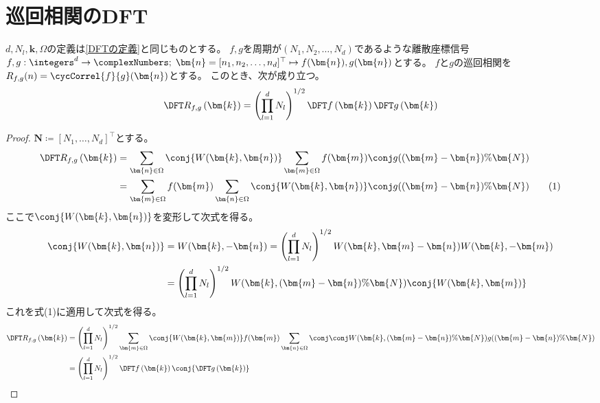    \section{巡回相関のDFT}
        \begin{shadebox}
            $d,N_l,\bm{k},\Omega$の定義は\ref{DFTの定義}と同じものとする。
            $f,g$を周期が$(N_1,N_2,\dots,N_d)$であるような離散座標信号$f,g: \integers^d\to\complexNumbers;\;\bm{n} = [n_1,n_2,\dots,n_d]^\top \mapsto f(\bm{n}),g(\bm{n})$とする。
            $f$と$g$の巡回相関を$R_{f,g}(n) = \cycCorrel{f}{g}(\bm{n})$とする。
            このとき、次が成り立つ。
            \[ \DFTwithArg{R_{f,g}}{\bm{k}} = \left(\prod_{l=1}^d N_l\right)^{1/2}\DFTwithArg{f}{\bm{k}}\DFTwithArg{g}{\bm{k}} \]
        \end{shadebox}
        \begin{proof}
            \quad\par
            $\bm{N} \coloneqq [N_1,\dots,N_d]^\top$とする。
            \begin{align*}
                \DFTwithArg{R_{f,g}}{\bm{k}} &= \sum_{\bm{n}\in\Omega} \conj{W(\bm{k},\bm{n})} \sum_{\bm{m}\in\Omega} f(\bm{m})\conj{g((\bm{m}-\bm{n})\%\bm{N})} \\
                &= \sum_{\bm{m}\in\Omega} f(\bm{m}) \sum_{\bm{n}\in\Omega} \conj{W(\bm{k},\bm{n})}\conj{g((\bm{m}-\bm{n})\%\bm{N})} \tag{1}
            \end{align*}
            ここで$\conj{W(\bm{k},\bm{n})}$を変形して次式を得る。
            \begin{align*}
                \conj{W(\bm{k},\bm{n})} &= W(\bm{k},-\bm{n}) = \left(\prod_{l=1}^d N_l\right)^{1/2}W(\bm{k},\bm{m}-\bm{n})W(\bm{k},-\bm{m}) \\
                &= \left(\prod_{l=1}^d N_l\right)^{1/2}W(\bm{k},(\bm{m}-\bm{n})\%\bm{N})\conj{W(\bm{k},\bm{m})}
            \end{align*}
            これを式(1)に適用して次式を得る。
            \begin{align*}
                \DFTwithArg{R_{f,g}}{\bm{k}} &= \left(\prod_{l=1}^d N_l\right)^{1/2} \sum_{\bm{m}\in\Omega} \conj{W(\bm{k},\bm{m})}f(\bm{m}) \sum_{\bm{n}\in\Omega}\conj{\conj{W(\bm{k},(\bm{m}-\bm{n})\%\bm{N})}g((\bm{m}-\bm{n})\%\bm{N})} \\
                &= \left(\prod_{l=1}^d N_l\right)^{1/2}\DFTwithArg{f}{\bm{k}}\conj{\DFTwithArg{g}{\bm{k}}}
            \end{align*}
        \end{proof}

